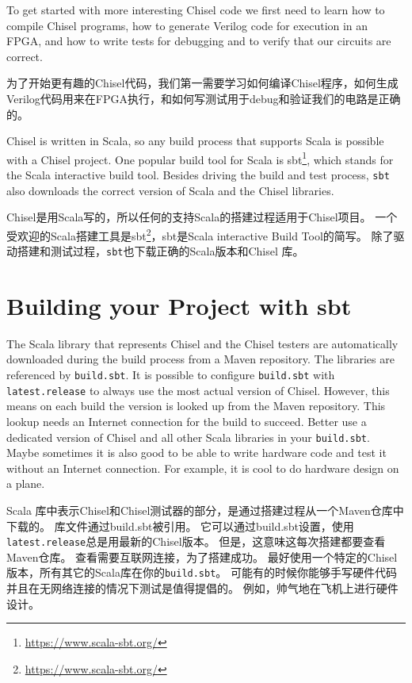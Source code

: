 \documentclass[%
    10pt,
    headinclude, footexclude,
    openright, %
    notitlepage,
    cleardoubleempty,
    headsepline,
    pointlessnumbers,
    bibtotoc, idxtotoc,
    ]{scrbook}
\newcommand{\code}[1]{{\small{\texttt{#1}}}}
\newcommand{\myref}[2]{\href{#1}{#2}}
\renewcommand{\myref}[2]{{#2}{\footnote{\url{#1}}}}
\begin{document}
To get started with more interesting Chisel code we first need to learn how to compile
Chisel programs, how to generate Verilog code for execution in an FPGA, and how
to write tests for debugging and to verify that our circuits are correct.

为了开始更有趣的Chisel代码，我们第一需要学习如何编译Chisel程序，如何生成Verilog代码用来在FPGA执行，和如何写测试用于debug和验证我们的电路是正确的。


Chisel is written in Scala, so any build process that supports Scala is possible
with a Chisel project. One popular build tool for Scala is \myref{https://www.scala-sbt.org/}{sbt},
which stands for the Scala interactive build tool.
Besides driving the build and test process, \code{sbt} also downloads the correct
version of Scala and the Chisel libraries.

Chisel是用Scala写的，所以任何的支持Scala的搭建过程适用于Chisel项目。
一个受欢迎的Scala搭建工具是\myref{https://www.scala-sbt.org/}{sbt}，sbt是Scala interactive Build Tool的简写。
除了驱动搭建和测试过程，\code{sbt}也下载正确的Scala版本和Chisel 库。


\section{Building your Project with sbt}

The Scala library that represents Chisel and the Chisel testers are automatically
downloaded during the build process from a Maven repository.
The libraries are referenced by \code{build.sbt}. It is possible to configure \code{build.sbt}
with \code{latest.release} to always use the most actual version of Chisel.
However, this means on each build the version is looked up from the Maven
repository. This lookup needs an Internet connection for the build to succeed.
Better use a dedicated version of Chisel and all other Scala libraries in your \code{build.sbt}.
Maybe sometimes it is also good to be able to write hardware code and test it without an Internet connection.
For example, it is cool to do hardware design on a plane.

Scala 库中表示Chisel和Chisel测试器的部分，是通过搭建过程从一个Maven仓库中下载的。
库文件通过build.sbt被引用。
它可以通过build.sbt设置，使用\code{latest.release}总是用最新的Chisel版本。
但是，这意味这每次搭建都要查看Maven仓库。
查看需要互联网连接，为了搭建成功。
最好使用一个特定的Chisel版本，所有其它的Scala库在你的\code{build.sbt}。
可能有的时候你能够手写硬件代码并且在无网络连接的情况下测试是值得提倡的。
例如，帅气地在飞机上进行硬件设计。
\end{document}
